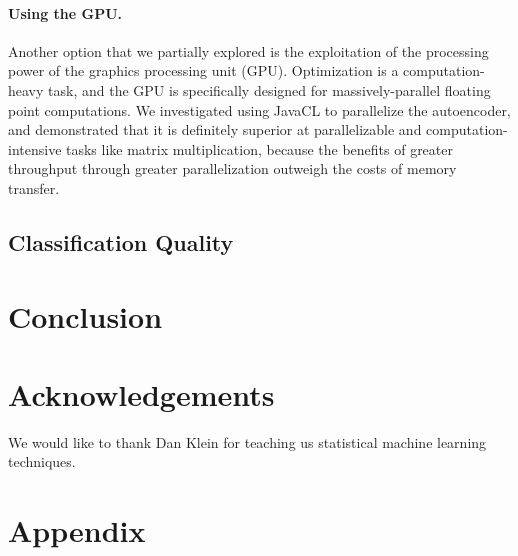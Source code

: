 \documentclass[11pt]{article}
\begin{document}
\paragraph{Using the GPU.}
Another option that we partially explored is the exploitation of the processing power of the graphics processing unit (GPU). Optimization is a computation-heavy task, and the GPU is specifically designed for massively-parallel floating point computations. We investigated using JavaCL to parallelize the autoencoder, and demonstrated that it is definitely superior at parallelizable and computation-intensive tasks like matrix multiplication, because the benefits of greater throughput through greater parallelization outweigh the costs of memory transfer.

\subsection{Classification Quality}

\section{Conclusion}

\section{Acknowledgements}
We would like to thank Dan Klein for teaching us statistical machine learning techniques.
\section*{Appendix}
\end{document}
